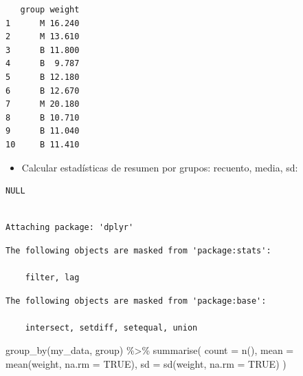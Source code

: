 \documentclass[
  letterpaper,
  DIV=11,
  numbers=noendperiod]{scrartcl}
\newenvironment{Shaded}{\begin{snugshade}}{\end{snugshade}}
\newcommand{\AttributeTok}[1]{\textcolor[rgb]{0.40,0.45,0.13}{#1}}
\newcommand{\CommentTok}[1]{\textcolor[rgb]{0.37,0.37,0.37}{#1}}
\newcommand{\ConstantTok}[1]{\textcolor[rgb]{0.56,0.35,0.01}{#1}}
\newcommand{\FunctionTok}[1]{\textcolor[rgb]{0.28,0.35,0.67}{#1}}
\newcommand{\NormalTok}[1]{\textcolor[rgb]{0.00,0.23,0.31}{#1}}
\newcommand{\OtherTok}[1]{\textcolor[rgb]{0.00,0.23,0.31}{#1}}
\newcommand{\SpecialCharTok}[1]{\textcolor[rgb]{0.37,0.37,0.37}{#1}}
\newcommand{\StringTok}[1]{\textcolor[rgb]{0.13,0.47,0.30}{#1}}
\providecommand{\tightlist}{%
  \setlength{\itemsep}{0pt}\setlength{\parskip}{0pt}}\usepackage{longtable,booktabs,array}
\begin{document}
\begin{verbatim}
   group weight
1      M 16.240
2      M 13.610
3      B 11.800
4      B  9.787
5      B 12.180
6      B 12.670
7      M 20.180
8      B 10.710
9      B 11.040
10     B 11.410
\end{verbatim}

\begin{itemize}
\tightlist
\item
  Calcular estadísticas de resumen por grupos: recuento, media, sd:
\end{itemize}

\begin{Shaded}
\end{Shaded}

\begin{verbatim}
NULL
\end{verbatim}

\begin{Shaded}
\end{Shaded}

\begin{verbatim}

Attaching package: 'dplyr'
\end{verbatim}

\begin{verbatim}
The following objects are masked from 'package:stats':

    filter, lag
\end{verbatim}

\begin{verbatim}
The following objects are masked from 'package:base':

    intersect, setdiff, setequal, union
\end{verbatim}

\begin{Shaded}
\begin{Highlighting}[]
\FunctionTok{group\_by}\NormalTok{(my\_data, group) }\SpecialCharTok{\%\textgreater{}\%}
  \FunctionTok{summarise}\NormalTok{(}
    \AttributeTok{count =} \FunctionTok{n}\NormalTok{(),}
    \AttributeTok{mean =} \FunctionTok{mean}\NormalTok{(weight, }\AttributeTok{na.rm =} \ConstantTok{TRUE}\NormalTok{),}
    \AttributeTok{sd =} \FunctionTok{sd}\NormalTok{(weight, }\AttributeTok{na.rm =} \ConstantTok{TRUE}\NormalTok{)}
\NormalTok{  )}
\end{Highlighting}
\end{Shaded}
\end{document}
